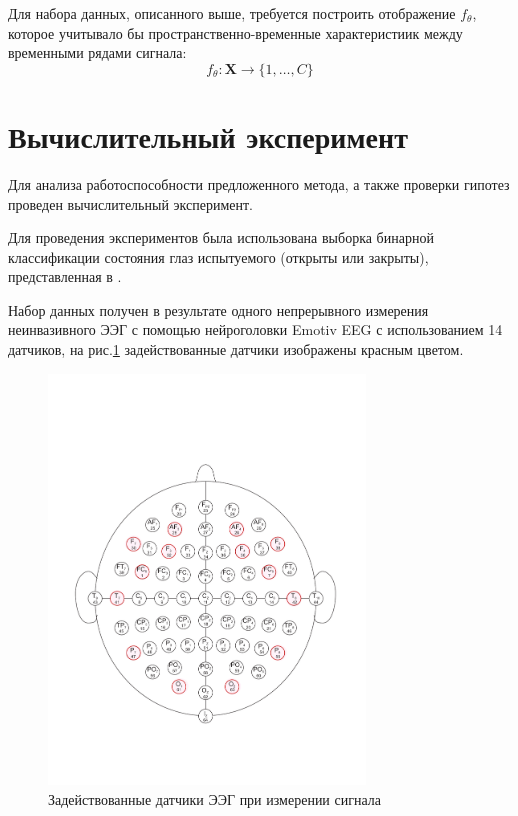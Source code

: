 \documentclass[a4paper, 12pt]{extarticle}
\begin{document}
Для набора данных, описанного выше, требуется построить отображение $f_\theta$, которое учитывало 
бы пространственно-временные характеристиик между временными рядами сигнала:
$$f_\theta: \bm{X} \rightarrow \{1,\dots, C\}$$ 




\section{Вычислительный эксперимент}

Для анализа работоспособности предложенного метода, а также проверки гипотез
проведен вычислительный эксперимент.

Для проведения экспериментов была использована выборка бинарной классификации состояния глаз 
испытуемого (открыты или закрыты), представленная в \citep{misc_eeg_eye_state_264}.

Набор данных получен в результате одного непрерывного измерения неинвазивного ЭЭГ с 
помощью нейроголовки Emotiv EEG с использованием 14 датчиков, на рис.\ref{fig:1} задействованные датчики
изображены красным цветом. 
\begin{figure}[h]
	\centering
	\includegraphics[width=0.75\textwidth]{64_channel_sharbrough.pdf}
	\caption{Задействованные датчики ЭЭГ при измерении сигнала}
	\label{fig:1}
\end{figure}
\end{document}
